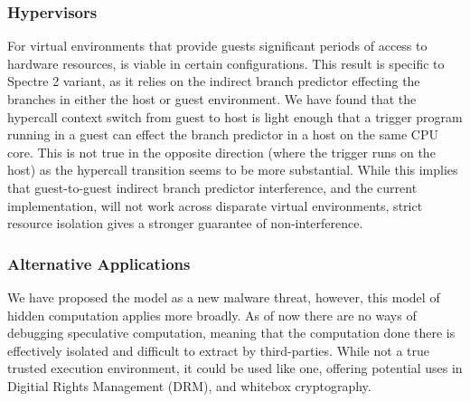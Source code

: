 \subsubsection{Hypervisors}
For virtual environments that provide guests significant periods of access to
hardware resources, \speculake is viable in certain configurations. 
This result is specific to Spectre 2 variant, as it relies on 
the indirect branch predictor effecting the branches in either the host 
or guest environment. We have found that the hypercall context switch from 
guest to host is light enough that a trigger program running in a guest
can effect the branch predictor in a host on the same CPU core. This is not
true in the opposite direction (where the trigger runs on the host) as the 
hypercall transition seems to be more substantial. While this implies 
that guest-to-guest indirect branch predictor interference, and the current
\speculake implementation, will not work across disparate virtual environments,
strict resource isolation gives a stronger guarantee of non-interference. 



\subsubsection{Alternative Applications}
We have proposed the \speculake model as a new malware threat, however, this
model of hidden computation applies more broadly. As of now there are no ways of
debugging speculative computation, meaning that the computation done there is
effectively isolated and difficult to extract by third-parties. While not a true
trusted execution environment, it could be used like one, offering potential
uses in Digitial Rights Management (DRM), and whitebox cryptography.



